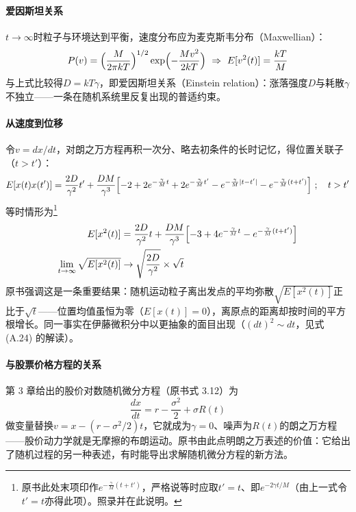 \paragraph{爱因斯坦关系}
$t\to\infty$时粒子与环境达到平衡，速度分布应为麦克斯韦分布（Maxwellian）：
\begin{equation*}
P(v)=\Bigl(\frac{M}{2\pi kT}\Bigr)^{1/2}
\exp\Bigl(-\frac{Mv^2}{2kT}\Bigr)
\ \Rightarrow\
E[v^2(t)]=\frac{kT}{M}
\end{equation*}
与上式比较得$D=kT\gamma$，即爱因斯坦关系（Einstein relation）：涨落强度$D$与耗散$\gamma$不独立——一条在随机系统里反复出现的普适约束。

\paragraph{从速度到位移}
令$v=dx/dt$，对朗之万方程再积一次分、略去初条件的长时记忆，得位置关联子（$t>t'$）：
\begin{equation*}
E[x(t)x(t')]=\frac{2D}{\gamma^2}t'
+\frac{DM}{\gamma^3}\Bigl[-2+2e^{-\frac{\gamma}{M}t}
+2e^{-\frac{\gamma}{M}t'}
-e^{-\frac{\gamma}{M}|t-t'|}
-e^{-\frac{\gamma}{M}(t+t')}\Bigr]
\ ;\quad t>t'
\end{equation*}
等时情形为\footnote{原书此处末项印作$e^{-\frac{\gamma}{M}(t+t')}$，严格说等时应取$t'=t$、即$e^{-2\gamma t/M}$（由上一式令$t'=t$亦得此项）。照录并在此说明。}
\begin{align*}
E[x^2(t)]&=\frac{2D}{\gamma^2}t
+\frac{DM}{\gamma^3}\Bigl[-3+4e^{-\frac{\gamma}{M}t}
-e^{-\frac{\gamma}{M}(t+t')}\Bigr]\\
\lim_{t\to\infty}\sqrt{E[x^2(t)]}&\to
\sqrt{\frac{2D}{\gamma^2}}\times\sqrt{t}
\end{align*}
原书强调这是一条重要结果：随机运动粒子离出发点的平均弥散$\sqrt{E[x^2(t)]}$正比于$\sqrt{t}$——位置均值虽恒为零（$E[x(t)]=0$），离原点的距离却按时间的平方根增长。同一事实在伊藤微积分中以更抽象的面目出现（$(dt)^2\sim dt$，见式 (A.24) 的解读）。

\paragraph{与股票价格方程的关系}
第 3 章给出的股价对数随机微分方程（原书式 3.12）为
\begin{equation*}
\frac{dx}{dt}=r-\frac{\sigma^2}{2}+\sigma R(t)
\end{equation*}
做变量替换$v=x-(r-\sigma^2/2)t$，它就成为$\gamma=0$、噪声为$R(t)$的朗之万方程——股价动力学就是无摩擦的布朗运动。原书由此点明朗之万表述的价值：它给出了随机过程的另一种表述，有时能导出求解随机微分方程的新方法。

